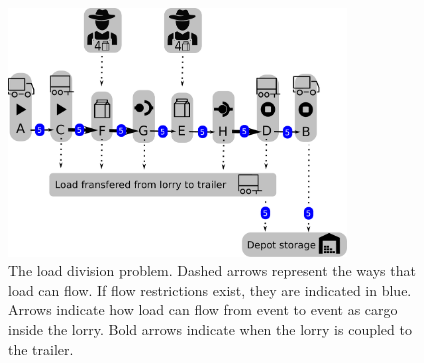 



\begin{figure}[!h]
  \centering
    \includegraphics[width=0.8\textwidth]{img/trivial_flow_v2.pdf}
  \caption{The load division problem. Dashed arrows represent the ways that load can flow. If flow restrictions exist, they are indicated in blue.
 Arrows indicate how load can flow from event to event as cargo inside the lorry.
 Bold arrows indicate when the lorry is coupled to the trailer.}
  \label{fig:flow}
\end{figure}

